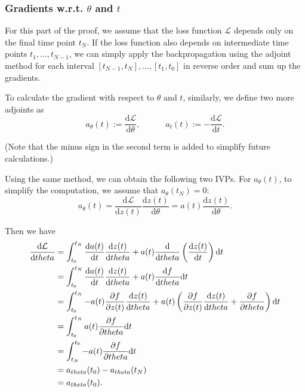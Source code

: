 \documentclass[a4paper,11pt,titlepage]{article}
\theoremstyle{definition}
\theoremstyle{plain}
\theoremstyle{remark}
\begin{document}
\subsubsection{Gradients w.r.t. \(\theta\) and \(t\)}

For this part of the proof, we assume that the loss function $\mathcal{L}$ depends only on the final time point $t_N$. If the loss function also depends on intermediate time points $t_1,\dots,t_{N-1}$, we can simply apply the backpropagation using the adjoint method for each interval $[t_{N-1},t_N],\dots,[t_1,t_0]$ in reverse order and sum up the gradients. 

To calculate the gradient with respect to $\theta$ and $t$, similarly, we define two more adjoints as
$$a_{\theta}(t):=\frac{\mathrm{d}\mathcal{L}}{\mathrm{d} \theta},
\quad\quad\quad a_{t}(t):=-\frac{\mathrm{d}\mathcal{L}}{\mathrm{d} t}.$$

(Note that the minus sign in the second term is added to simplify future calculations.)

Using the same method, we can obtain the following two IVPs. For $a_\theta(t)$, to simplify the computation, we assume that $a_\theta(t_N)=0$:
$$
a_{\theta}(t) = \frac{\mathrm{d}\mathcal{L}}{\mathrm{d} z(t)}\frac{\mathrm{d} z(t)}{\mathrm{d}\theta}=a(t)\frac{\mathrm{d} z(t)}{\mathrm{d}\theta}.
$$

Then we have
\begin{align}
\frac{\mathrm{d}\mathcal{L}}{\mathrm{d}\theta}&=\int_{t_0}^{t_N}\frac{\mathrm{d}a(t)}{\mathrm{d}t}\frac{\mathrm{d} z(t)}{\mathrm{d}\theta}+a(t)\frac{\mathrm{d}}{\mathrm{d}\theta}\left(\frac{\mathrm{d}z(t)}{\mathrm{d}t}\right)\mathrm{d}t\notag\\
&=\int_{t_0}^{t_N}\frac{\mathrm{d}a(t)}{\mathrm{d}t}\frac{\mathrm{d}z(t)}{\mathrm{d}\theta}+a(t)\frac{\mathrm{d}f}{\mathrm{d}\theta}\mathrm{d}t\notag\\
&=\int_{t_0}^{t_N}-a(t)\frac{\partial f}{\partial z(t)}\frac{\mathrm{d}z(t)}{\mathrm{d}\theta}+a(t)\left(\frac{\partial f}{\partial z(t)}\frac{\mathrm{d}z(t)}{\mathrm{d}\theta}+\frac{\partial f}{\partial \theta}\right)\mathrm{d}t\notag\\
&=\int_{t_0}^{t_N}a(t)\frac{\partial f}{\partial \theta}\mathrm{d}t\notag\\
&=\int_{t_N}^{t_0}-a(t)\frac{\partial f}{\partial \theta}\mathrm{d}t\notag\\
&=a_{\theta}(t_0)-a_{\theta}(t_N)\notag\\
&=a_{\theta}(t_0).\notag
\end{align}
\end{document}
